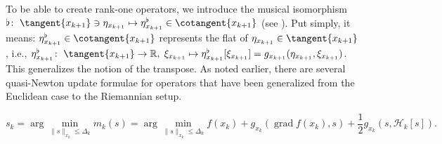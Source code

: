 To be able to create rank-one operators, we introduce the musical isomorphism $\flat \colon \; \tangent{x_{k+1}} \ni \eta_{x_{k+1}} \mapsto \eta^{\flat}_{x_{k+1}} \in \cotangent{x_{k+1}}$ (see \cite[p.~6]{BergmannHerzogLouzeiroSilvaTenbrinckVidalNunez:2020:1}). Put simply, it means: $\eta^{\flat}_{x_{k+1}} \in \cotangent{x_{k+1}}$ represents the flat of $\eta_{x_{k+1}} \in \tangent{x_{k+1}}$, i.e., $\eta^{\flat}_{x_{k+1}} \colon \; \tangent{x_{k+1}} \to \mathbb{R}, \;  \xi_{x_{k+1}} \mapsto \eta^{\flat}_{x_{k+1}}[\xi_{x_{k+1}}] = g_{x_{k+1}} (\eta_{x_{k+1}}, \xi_{x_{k+1}})$. This generalizes the notion of the transpose. As noted earlier, there are several quasi-Newton update formulae for operators that have been generalized from the Euclidean case to the Riemannian setup. 

\begin{equation}\label{Riemanniantrsubproblem}
    s_k = \arg \min_{\lVert s \rVert_{x_k} \leq \Delta_k} m_k( s ) = \arg \min_{\lVert s \rVert_{x_k} \leq \Delta_k} f(x_k) + g_{x_k}(\operatorname{grad} f(x_k), s ) + \frac{1}{2} g_{x_k}( s , \mathcal{H}_k [ s ] ).
\end{equation}

